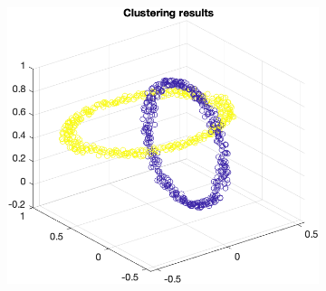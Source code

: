 \documentclass[a4paper, 11pt, one column]{article}
\begin{document}
\begin{figure}[]
\begin{subfigure}{0.33\textwidth}
        \end{subfigure}\hfil
        \begin{subfigure}{0.33\textwidth}
            \includegraphics[width=\linewidth]{images/7.png}
        \end{subfigure}\hfil


\end{figure}
\end{document}
